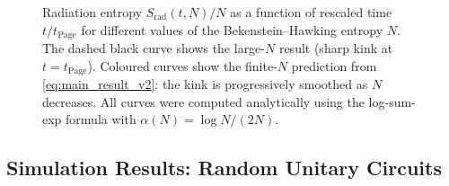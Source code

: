 \documentclass[12pt,a4paper]{article}
\newcommand{\Srad}{S_{\mathrm{rad}}}
\newcommand{\tPage}{t_{\mathrm{Page}}}
\begin{document}
\begin{figure}[htbp]
\caption{%
  Radiation entropy $\Srad(t,N)/N$ as a function of rescaled time
  $t/\tPage$ for different values of the Bekenstein--Hawking entropy $N$.
  The dashed black curve shows the large-$N$ result (sharp kink at
  $t = \tPage$).  Coloured curves show the finite-$N$ prediction from
  \cref{eq:main_result_v2}: the kink is progressively smoothed as $N$
  decreases.  All curves were computed analytically using the log-sum-exp
  formula with $\alpha(N) = \log N/(2N)$.
}
\label{fig:page_curve}
\end{figure}

\subsection{Simulation Results: Random Unitary Circuits}
\label{subsec:simulation_results}
\end{document}
